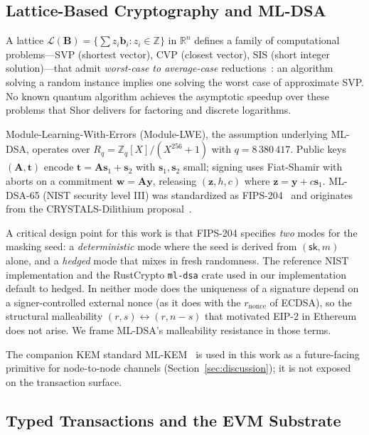 \documentclass[journal,onecolumn,11pt]{IEEEtran}
\begin{document}
\subsection{Lattice-Based Cryptography and ML-DSA}
\label{sec:bg_mldsa}

A lattice $\mathcal{L}(\mathbf{B}) = \{\sum z_i \mathbf{b}_i : z_i \in \mathbb{Z}\}$ in $\mathbb{R}^n$ defines a family of computational problems---SVP (shortest vector), CVP (closest vector), SIS (short integer solution)---that admit \emph{worst-case to average-case} reductions~\cite{ajtai1996,regev2005,lenstra1982lll}: an algorithm solving a random instance implies one solving the worst case of approximate SVP. No known quantum algorithm achieves the asymptotic speedup over these problems that Shor delivers for factoring and discrete logarithms.

Module-Learning-With-Errors (Module-LWE), the assumption underlying ML-DSA, operates over $R_q = \mathbb{Z}_q[X]/(X^{256}+1)$ with $q = 8\,380\,417$. Public keys $(\mathbf{A}, \mathbf{t})$ encode $\mathbf{t} = \mathbf{A}\mathbf{s}_1 + \mathbf{s}_2$ with $\mathbf{s}_1, \mathbf{s}_2$ small; signing uses Fiat-Shamir with aborts on a commitment $\mathbf{w} = \mathbf{A}\mathbf{y}$, releasing $(\mathbf{z}, h, c)$ where $\mathbf{z} = \mathbf{y} + c\mathbf{s}_1$. ML-DSA-65 (NIST security level III) was standardized as FIPS-204~\cite{nistfips204} and originates from the CRYSTALS-Dilithium proposal~\cite{ducas2018dilithium}.

A critical design point for this work is that FIPS-204 specifies \emph{two} modes for the masking seed: a \emph{deterministic} mode where the seed is derived from $(\mathsf{sk}, m)$ alone, and a \emph{hedged} mode that mixes in fresh randomness. The reference NIST implementation and the RustCrypto \texttt{ml-dsa} crate used in our implementation default to hedged. In neither mode does the uniqueness of a signature depend on a signer-controlled external nonce (as it does with the $r_{\text{nonce}}$ of ECDSA), so the structural malleability $(r, s) \leftrightarrow (r, n{-}s)$ that motivated EIP-2 in Ethereum does not arise. We frame ML-DSA's malleability resistance in those terms.

The companion KEM standard ML-KEM~\cite{nistfips203,bos2018kyber} is used in this work as a future-facing primitive for node-to-node channels (Section~\ref{sec:discussion}); it is not exposed on the transaction surface.

\subsection{Typed Transactions and the EVM Substrate}
\label{sec:bg_evm}
\end{document}
